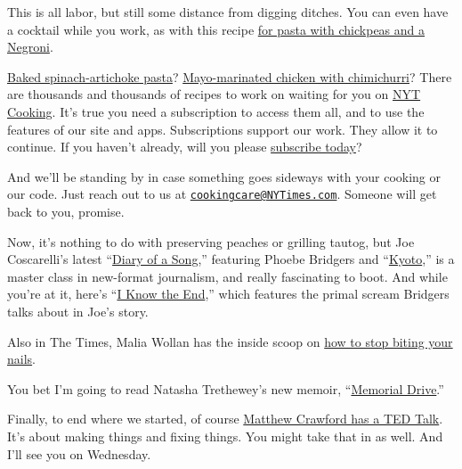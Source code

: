 This is all labor, but still some distance from digging ditches. You can
even have a cocktail while you work, as with this recipe
\href{https://cooking.nytimes3xbfgragh.onion/recipes/1020019-pasta-with-chickpeas-and-a-negroni}{for
pasta with chickpeas and a Negroni}.

\href{https://cooking.nytimes3xbfgragh.onion/recipes/1020080-baked-spinach-artichoke-pasta}{Baked
spinach-artichoke pasta}?
\href{https://cooking.nytimes3xbfgragh.onion/recipes/1020543-mayo-marinated-chicken-with-chimichurri}{Mayo-marinated
chicken with chimichurri}? There are thousands and thousands of recipes
to work on waiting for you on
\href{https://cooking.nytimes3xbfgragh.onion/}{NYT Cooking}. It's true
you need a subscription to access them all, and to use the features of
our site and apps. Subscriptions support our work. They allow it to
continue. If you haven't already, will you please
\href{https://www.nytimes3xbfgragh.onion/subscription/cooking.html?campaignId=6XQHR}{subscribe
today}?

And we'll be standing by in case something goes sideways with your
cooking or our code. Just reach out to us at
\href{mailto:cookingcare@NYTimes.com}{\nolinkurl{cookingcare@NYTimes.com}}.
Someone will get back to you, promise.

Now, it's nothing to do with preserving peaches or grilling tautog, but
Joe Coscarelli's latest
``\href{https://www.nytimes3xbfgragh.onion/2020/07/30/arts/music/phoebe-bridgers-kyoto.html}{Diary
of a Song},'' featuring Phoebe Bridgers and
``\href{https://www.youtube.com/watch?v=Tw0zYd0eIlk}{Kyoto},'' is a
master class in new-format journalism, and really fascinating to boot.
And while you're at it, here's
``\href{https://www.youtube.com/watch?v=WJ9-xN6dCW4}{I Know the End},''
which features the primal scream Bridgers talks about in Joe's story.

Also in The Times, Malia Wollan has the inside scoop on
\href{https://www.nytimes3xbfgragh.onion/2020/07/28/magazine/how-to-stop-biting-your-nails.html}{how
to stop biting your nails}.

You bet I'm going to read Natasha Trethewey's new memoir,
``\href{https://www.nytimes3xbfgragh.onion/2020/07/27/books/review-memorial-drive-memoir-natasha-trethewey.html}{Memorial
Drive}.''

Finally, to end where we started, of course
\href{https://www.youtube.com/watch?v=xdGky1JZovg}{Matthew Crawford has
a TED Talk}. It's about making things and fixing things. You might take
that in as well. And I'll see you on Wednesday.

